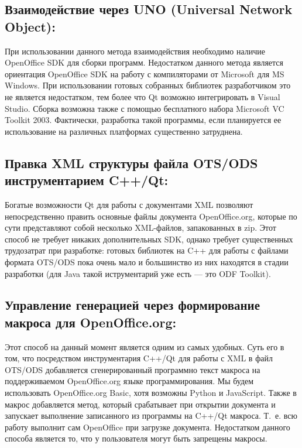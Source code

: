 \documentclass[10pt, a5paper]{article}
\begin{document}
\subsection*{Взаимодействие через UNO (Universal Network Object):}
При использовании данного метода взаимодействия необходимо наличие OpenOffice SDK для сборки программ. Недостатком данного метода является ориентация OpenOffice SDK на работу с компиляторами от Microsoft для MS Windows. При использовании готовых собранных библиотек разработчиком это не является недостатком, тем более что Qt возможно интегрировать в Visual Studio. Сборка возможна также с помощью бесплатного набора Microsoft VC Toolkit 2003. Фактически, разработка такой программы, если планируется ее использование на различных платформах существенно затруднена.

\subsection*{Правка XML структуры файла OTS/ODS инструментарием C++/Qt:}
Богатые возможности Qt для работы с документами XML позволяют непосредственно править основные файлы документа OpenOffice.org, которые по сути представляют собой несколько XML-файлов, запакованных в zip. Этот способ не требует никаких дополнительных SDK, однако требует существенных трудозатрат при разработке: готовых библиотек на C++ для работы с файлами формата OTS/ODS пока очень мало и большинство из них находятся в стадии разработки (для Java такой иструментарий уже есть — это ODF Toolkit).

\subsection*{Управление генерацией через формирование макроса для OpenOffice.org:}
Этот способ на данный момент является одним из самых удобных. Суть его в том, что посредством инструментария C++/Qt для работы с XML в файл  OTS/ODS добавляется сгенерированный программно текст макроса на поддерживаемом OpenOffice.org языке программирования. Мы будем использовать OpenOffice.org Basic, хотя возможны Python и JavaScript. Также в макрос добавляется метод, который срабатывает при открытии документа и запускает выполнение записанного из программы на C++/Qt макроса. Т. е. всю работу выполнит сам OpenOffice при загрузке документа. Недостатком данного способа является то, что у пользователя могут быть запрещены макросы.
\end{document}
